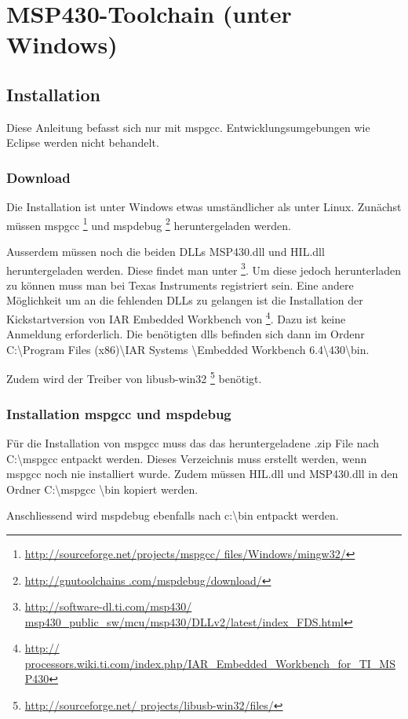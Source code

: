 \section{MSP430-Toolchain (unter Windows)}
\subsection{Installation}
Diese Anleitung befasst sich nur mit mspgcc. Entwicklungsumgebungen wie Eclipse 
werden nicht behandelt. 
\subsubsection{Download}
Die Installation ist unter Windows etwas umständlicher als unter Linux. 
Zunächst müssen mspgcc \footnote{\url{http://sourceforge.net/projects/mspgcc/
files/Windows/mingw32/}} und mspdebug \footnote{\url{http://gnutoolchains
.com/mspdebug/download/}} heruntergeladen werden. 

Ausserdem müssen noch die beiden DLLs MSP430.dll und HIL.dll heruntergeladen 
werden. Diese findet man unter \footnote{\url{http://software-dl.ti.com/msp430/
msp430_public_sw/mcu/msp430/DLLv2/latest/index_FDS.html}}. Um diese jedoch 
herunterladen zu können muss man bei Texas Instruments registriert sein. Eine 
andere Möglichkeit um an die fehlenden DLLs zu gelangen ist die Installation 
der Kickstartversion von IAR Embedded Workbench von \footnote{\url{http://
processors.wiki.ti.com/index.php/IAR_Embedded_Workbench_for_TI_MSP430}}. Dazu 
ist keine Anmeldung erforderlich. Die benötigten dlls befinden sich dann im 
Ordenr C:\textbackslash Program Files (x86)\textbackslash IAR Systems
\textbackslash Embedded Workbench 6.4\textbackslash 430\textbackslash bin. 

Zudem wird der Treiber von libusb-win32 \footnote{\url{http://sourceforge.net/
projects/libusb-win32/files/}} benötigt. 

\subsubsection{Installation mspgcc und mspdebug}
Für die Installation von mspgcc muss das das heruntergeladene .zip File 
nach C:\textbackslash mspgcc entpackt werden. Dieses Verzeichnis muss erstellt 
werden, wenn mspgcc noch nie installiert wurde. Zudem müssen HIL.dll und 
MSP430.dll in den Ordner C:\textbackslash mspgcc \textbackslash bin kopiert 
werden. 

Anschliessend wird mspdebug ebenfalls nach c:\textbackslash bin entpackt 
werden. 

